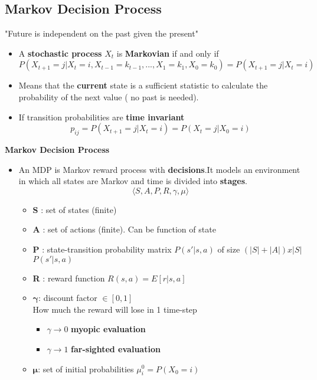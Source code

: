 \documentclass[12pt]{article} %
\begin{document}
\subsection{Markov Decision Process}
"Future is independent on the past given the present"

\begin{itemize}
\item A \textbf{stochastic process} $X_t$ is \textbf{Markovian} if and only if
$$ P(X_{t+1}=j | X_t =i , X_{t-1}= k_{t-1},...,X_1=k_1,X_0=k_0) = P(X_{t+1}= j|X_t=i)$$

\item Means that the \textbf{current} state is a sufficient statistic to calculate the probability of the next value ( no past is needed).

\item If transition probabilities are  \textbf{time invariant} 
$$ p_{ij} = P(X_{t+1}=j|X_t =i )=P(X_t= j|X_0=i)$$

\end{itemize}
\textbf{Markov Decision Process}
\begin{itemize}
\item An MDP is Markov reward process with \textbf{decisions}.It models an environment in which all states are	Markov and time is divided into \textbf{stages}.
$$ \langle S,A,P,R,\gamma,\mu \rangle$$
\begin{itemize}
\item \textbf{S} : set of states (finite)
\item \textbf{A} : set of actions (finite). Can be function of state
\item \textbf{P} : state-transition probability matrix $P(s'|s,a)$ of size $(|S|+|A|)x|S|$ $P(s'|s,a)$
\item \textbf{R} : reward function $R(s,a)=E[r|s,a]$
\item $\bm{\gamma}$: discount factor $\in [0,1]$\\
How much the reward will lose in 1 time-step
\begin{itemize}
\item $\gamma \rightarrow 0 $ \textbf{myopic evaluation}
\item $\gamma \rightarrow 1 $ \textbf{far-sighted evaluation}
\end{itemize}
\item $\bm{\mu}$: set of initial probabilities $\mu_i^0=P(X_0=i)$
\end{itemize}
\end{itemize}
\end{document}
